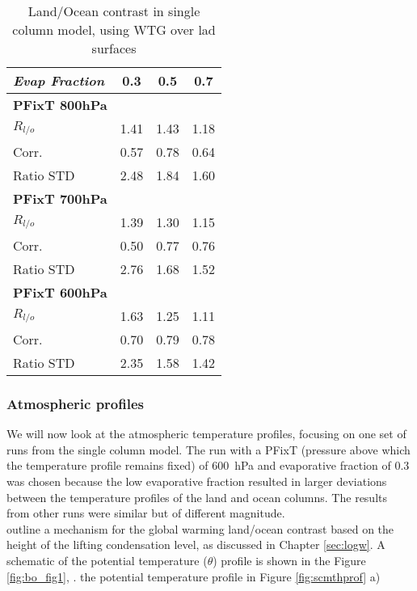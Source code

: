 \begin{center}
	\begin{table}[ht]
		\caption{Land/Ocean contrast in single column model, using WTG over lad 
		surfaces}
		\label{tab:scmrlo}
		\scriptsize
	\begin{tabular}{ l  c  c  c }
		\textit{Evap Fraction}		& 0.3   & 0.5  & 0.7 \\ \hline
		\textbf{PFixT 800hPa}\\%
		$R_{l/o}$  							& 1.41  & 1.43 & 1.18\\ %
	Corr.							& 0.57  & 0.78 & 0.64\\ %
	Ratio STD           			& 2.48  & 1.84 & 1.60\\ \hline
		\textbf{PFixT 700hPa}\\%
		$R_{l/o}$  							& 1.39  & 1.30 & 1.15\\ %
	Corr.							& 0.50  & 0.77 & 0.76\\ %
	Ratio STD           			& 2.76  & 1.68 & 1.52\\ \hline
		\textbf{PFixT 600hPa}\\%
		$R_{l/o}$  							& 1.63  & 1.25 & 1.11\\ %
	Corr.							& 0.70  & 0.79 & 0.78\\ %
	Ratio STD           			& 2.35  & 1.58 & 1.42\\ \hline
	\end{tabular}
	\end{table}
\end{center}


\subsubsection{Atmospheric profiles}
We will now look at the atmospheric temperature profiles, focusing on one set of 
runs from the single column model. The run with a PFixT (pressure above which 
the temperature profile remains fixed) of \SI{600}{\hecto\pascal} and 
evaporative fraction of 0.3 was chosen because the low evaporative fraction 
resulted in larger deviations between the temperature profiles of the land and 
ocean columns. The results from other runs were similar but of different 
magnitude. \\
\citet{Byrne2013a} outline a mechanism for the global warming land/ocean 
contrast based on the height of the lifting condensation level, as discussed in 
Chapter \ref{sec:logw}. A schematic of the potential temperature ($\theta$) 
profile is shown in the Figure \ref{fig:bo_fig1}, . the potential temperature  
profile in Figure \ref{fig:scmthprof} a) 


